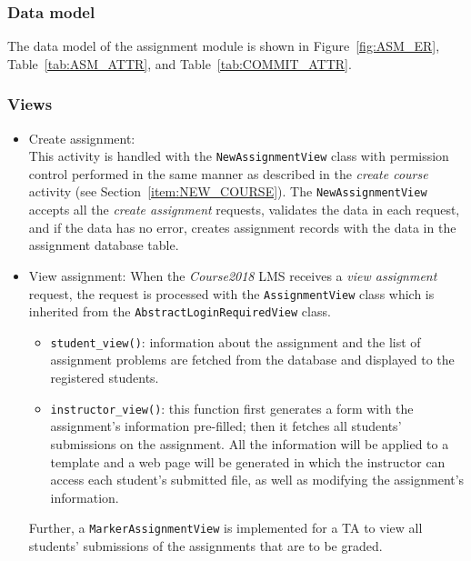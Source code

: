 \subsubsection{Data model}
The data model of the assignment module is shown in
Figure~\ref{fig:ASM_ER}, Table~\ref{tab:ASM_ATTR},
and Table~\ref{tab:COMMIT_ATTR}. \bigskip


\subsubsection{Views}
\begin{itemize}
    \item Create assignment: \\
        This activity is handled with the \texttt{NewAssignmentView} class with 
        permission control performed in the same manner as described in the
        \emph{create course} activity (see Section~\ref{item:NEW_COURSE}).
        The \texttt{NewAssignmentView} accepts all the \emph{create assignment}
        requests, validates the data in each request, and if the data has no
        error, creates assignment records with the data in the assignment
        database table.

    \item View assignment:
        When the \emph{Course2018} LMS receives a \emph{view assignment}
        request, the request is processed with the \texttt{AssignmentView}
        class which is inherited from the \texttt{AbstractLoginRequiredView}
        class.
        \begin{itemize}
            \item \texttt{student\_view()}:
                information about the assignment and the list of assignment
                problems are fetched from the database and displayed to the 
                registered students.
            \item \texttt{instructor\_view()}:
            \label{item:PROF_VIEW}
                this function first generates a form with the assignment's
                information pre-filled; then it fetches all students'
                submissions on the assignment. All the information will
                be applied to a template and a web page will be generated in
                which the instructor can access each student's submitted file,
                as well as modifying the assignment's information.
        \end{itemize}

        Further, a \texttt{MarkerAssignmentView} is implemented for a TA to
        view all students' submissions of the assignments that are to be
        graded.


\end{itemize}
